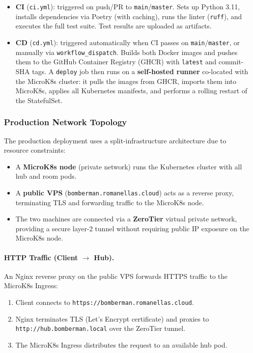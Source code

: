 \begin{itemize}
  \item \textbf{CI} (\texttt{ci.yml}): triggered on push/PR to \texttt{main}/\texttt{master}. Sets up Python 3.11, installs dependencies via Poetry (with caching), runs the linter (\texttt{ruff}), and executes the full test suite. Test results are uploaded as artifacts.
  \item \textbf{CD} (\texttt{cd.yml}): triggered automatically when CI passes on \texttt{main}/\texttt{master}, or manually via \texttt{workflow\_dispatch}. Builds both Docker images and pushes them to the GitHub Container Registry (GHCR) with \texttt{latest} and commit-SHA tags. A \texttt{deploy} job then runs on a \textbf{self-hosted runner} co-located with the MicroK8s cluster: it pulls the images from GHCR, imports them into MicroK8s, applies all Kubernetes manifests, and performs a rolling restart of the StatefulSet.
\end{itemize}

\subsubsection{Production Network Topology}

The production deployment uses a split-infrastructure architecture due to resource constraints:

\begin{itemize}
  \item A \textbf{MicroK8s node} (private network) runs the Kubernetes cluster with all hub and room pods.
  \item A \textbf{public VPS} (\texttt{bomberman.romanellas.cloud}) acts as a reverse proxy, terminating TLS and forwarding traffic to the MicroK8s node.
  \item The two machines are connected via a \textbf{ZeroTier} \cite{zerotier} virtual private network, providing a secure layer-2 tunnel without requiring public IP exposure on the MicroK8s node.
\end{itemize}

\paragraph{HTTP Traffic (Client $\rightarrow$ Hub).}
An Nginx \cite{nginx} reverse proxy on the public VPS forwards HTTPS traffic to the MicroK8s Ingress:
\begin{enumerate}
  \item Client connects to \texttt{https://bomberman.romanellas.cloud}.
  \item Nginx terminates TLS (Let's Encrypt certificate) and proxies to \texttt{http://hub.bomberman.local} over the ZeroTier tunnel.
  \item The MicroK8s Ingress distributes the request to an available hub pod.
\end{enumerate}

